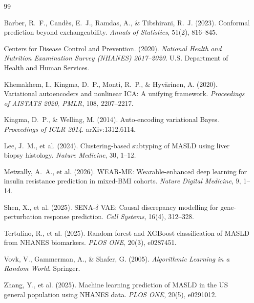 \documentclass[12pt,a4paper,oneside]{report}
\begin{document}

\begin{thebibliography}{99}

Barber, R.\ F., Cand\`es, E.\ J., Ramdas, A., \& Tibshirani, R.\ J. (2023).
\newblock Conformal prediction beyond exchangeability.
\newblock \textit{Annals of Statistics}, 51(2), 816--845.

Centers for Disease Control and Prevention. (2020).
\newblock \textit{National Health and Nutrition Examination Survey (NHANES) 2017--2020}.
\newblock U.S. Department of Health and Human Services.

Khemakhem, I., Kingma, D.\ P., Monti, R.\ P., \& Hyv{\"a}rinen, A. (2020).
\newblock Variational autoencoders and nonlinear ICA: A unifying framework.
\newblock \textit{Proceedings of AISTATS 2020, PMLR}, 108, 2207--2217.

Kingma, D.\ P., \& Welling, M. (2014).
\newblock Auto-encoding variational Bayes.
\newblock \textit{Proceedings of ICLR 2014}. arXiv:1312.6114.

Lee, J.\ M., et al. (2024).
\newblock Clustering-based subtyping of MASLD using liver biopsy histology.
\newblock \textit{Nature Medicine}, 30, 1--12.

Metwally, A.\ A., et al. (2026).
\newblock WEAR-ME: Wearable-enhanced deep learning for insulin resistance prediction in mixed-BMI cohorts.
\newblock \textit{Nature Digital Medicine}, 9, 1--14.

Shen, X., et al. (2025).
\newblock SENA-$\delta$ VAE: Causal discrepancy modelling for gene-perturbation response prediction.
\newblock \textit{Cell Systems}, 16(4), 312--328.

Tertulino, R., et al. (2025).
\newblock Random forest and XGBoost classification of MASLD from NHANES biomarkers.
\newblock \textit{PLOS ONE}, 20(3), e0287451.

Vovk, V., Gammerman, A., \& Shafer, G. (2005).
\newblock \textit{Algorithmic Learning in a Random World}.
\newblock Springer.

Zhang, Y., et al. (2025).
\newblock Machine learning prediction of MASLD in the US general population using NHANES data.
\newblock \textit{PLOS ONE}, 20(5), e0291012.

\end{thebibliography}
\end{document}
